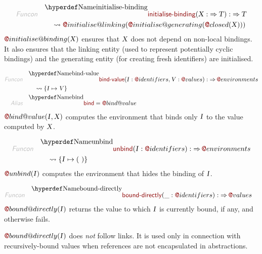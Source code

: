 \begin{align*}
  \KEY{Funcon} \quad
  & \FUNDEC{initialise-binding}(
                     \VAR{X} :  \TO \VAR{T}) 
    :  \TO \VAR{T} \\&\quad
    \leadsto \FUN@initialise@linking
               (  \FUN@initialise@generating
                       (  \FUN@closed
                               (  \VAR{X} ) ) )
\end{align*}
$\FUN@initialise@binding
    (  \VAR{X} )$ ensures that $\VAR{X}$ does not depend on non-local bindings.
  It also ensures that the linking entity (used to represent potentially cyclic
  bindings) and the generating entity (for creating fresh identifiers) are 
  initialised.

\begin{align*}
  \KEY{Funcon} \quad
  & \FUNDEC{bind-value}(
                     \VAR{I} : \FUN@identifiers, \VAR{V} : \FUN@values) 
    :  \TO \FUN@environments \\&\quad
    \leadsto \{ \VAR{I} \mapsto 
                  \VAR{V} \}
\\
  \KEY{Alias} \quad
  & \FUNDEC{bind} = \FUN@bind@value
\end{align*}
$\FUN@bind@value
    (  \VAR{I}, 
           \VAR{X} )$ computes the environment that binds only $\VAR{I}$ to the value
  computed by $\VAR{X}$.

\begin{align*}
  \KEY{Funcon} \quad
  & \FUNDEC{unbind}(
                     \VAR{I} : \FUN@identifiers) 
    :  \TO \FUN@environments \\&\quad
    \leadsto \{ \VAR{I} \mapsto 
                  (   \  ) \}
\end{align*}
$\FUN@unbind
    (  \VAR{I} )$ computes the environment that hides the binding of $\VAR{I}$.

\begin{align*}
  \KEY{Funcon} \quad
  & \FUNDEC{bound-directly}(
                     \_ : \FUN@identifiers) 
    :  \TO \FUN@values 
\end{align*}
$\FUN@bound@directly
    (  \VAR{I} )$ returns the value to which $\VAR{I}$ is currently bound, if any,
  and otherwise fails.

$\FUN@bound@directly
    (  \VAR{I} )$ does \emph{not} follow links. It is used only in connection with
  recursively-bound values when references are not encapsulated in abstractions.

